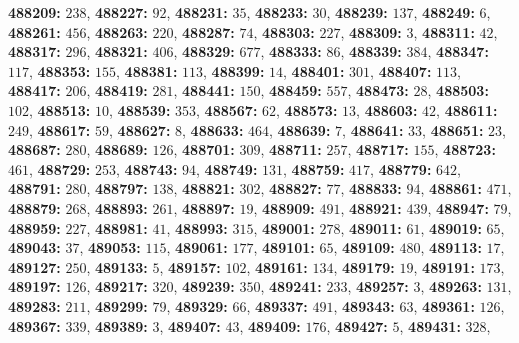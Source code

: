 \textsf{\bfseries 488209:} $238$, \textsf{\bfseries 488227:} $92$, \textsf{\bfseries 488231:} $35$, \textsf{\bfseries 488233:} $30$, \textsf{\bfseries 488239:} $137$, \textsf{\bfseries 488249:} $6$, \textsf{\bfseries 488261:} $456$, \textsf{\bfseries 488263:} $220$, \textsf{\bfseries 488287:} $74$, \textsf{\bfseries 488303:} $227$, \textsf{\bfseries 488309:} $3$, \textsf{\bfseries 488311:} $42$, \textsf{\bfseries 488317:} $296$, \textsf{\bfseries 488321:} $406$, \textsf{\bfseries 488329:} $677$, \textsf{\bfseries 488333:} $86$, \textsf{\bfseries 488339:} $384$, \textsf{\bfseries 488347:} $117$, \textsf{\bfseries 488353:} $155$, \textsf{\bfseries 488381:} $113$, \textsf{\bfseries 488399:} $14$, \textsf{\bfseries 488401:} $301$, \textsf{\bfseries 488407:} $113$, \textsf{\bfseries 488417:} $206$, \textsf{\bfseries 488419:} $281$, \textsf{\bfseries 488441:} $150$, \textsf{\bfseries 488459:} $557$, \textsf{\bfseries 488473:} $28$, \textsf{\bfseries 488503:} $102$, \textsf{\bfseries 488513:} $10$, \textsf{\bfseries 488539:} $353$, \textsf{\bfseries 488567:} $62$, \textsf{\bfseries 488573:} $13$, \textsf{\bfseries 488603:} $42$, \textsf{\bfseries 488611:} $249$, \textsf{\bfseries 488617:} $59$, \textsf{\bfseries 488627:} $8$, \textsf{\bfseries 488633:} $464$, \textsf{\bfseries 488639:} $7$, \textsf{\bfseries 488641:} $33$, \textsf{\bfseries 488651:} $23$, \textsf{\bfseries 488687:} $280$, \textsf{\bfseries 488689:} $126$, \textsf{\bfseries 488701:} $309$, \textsf{\bfseries 488711:} $257$, \textsf{\bfseries 488717:} $155$, \textsf{\bfseries 488723:} $461$, \textsf{\bfseries 488729:} $253$, \textsf{\bfseries 488743:} $94$, \textsf{\bfseries 488749:} $131$, \textsf{\bfseries 488759:} $417$, \textsf{\bfseries 488779:} $642$, \textsf{\bfseries 488791:} $280$, \textsf{\bfseries 488797:} $138$, \textsf{\bfseries 488821:} $302$, \textsf{\bfseries 488827:} $77$, \textsf{\bfseries 488833:} $94$, \textsf{\bfseries 488861:} $471$, \textsf{\bfseries 488879:} $268$, \textsf{\bfseries 488893:} $261$, \textsf{\bfseries 488897:} $19$, \textsf{\bfseries 488909:} $491$, \textsf{\bfseries 488921:} $439$, \textsf{\bfseries 488947:} $79$, \textsf{\bfseries 488959:} $227$, \textsf{\bfseries 488981:} $41$, \textsf{\bfseries 488993:} $315$, \textsf{\bfseries 489001:} $278$, \textsf{\bfseries 489011:} $61$, \textsf{\bfseries 489019:} $65$, \textsf{\bfseries 489043:} $37$, \textsf{\bfseries 489053:} $115$, \textsf{\bfseries 489061:} $177$, \textsf{\bfseries 489101:} $65$, \textsf{\bfseries 489109:} $480$, \textsf{\bfseries 489113:} $17$, \textsf{\bfseries 489127:} $250$, \textsf{\bfseries 489133:} $5$, \textsf{\bfseries 489157:} $102$, \textsf{\bfseries 489161:} $134$, \textsf{\bfseries 489179:} $19$, \textsf{\bfseries 489191:} $173$, \textsf{\bfseries 489197:} $126$, \textsf{\bfseries 489217:} $320$, \textsf{\bfseries 489239:} $350$, \textsf{\bfseries 489241:} $233$, \textsf{\bfseries 489257:} $3$, \textsf{\bfseries 489263:} $131$, \textsf{\bfseries 489283:} $211$, \textsf{\bfseries 489299:} $79$, \textsf{\bfseries 489329:} $66$, \textsf{\bfseries 489337:} $491$, \textsf{\bfseries 489343:} $63$, \textsf{\bfseries 489361:} $126$, \textsf{\bfseries 489367:} $339$, \textsf{\bfseries 489389:} $3$, \textsf{\bfseries 489407:} $43$, \textsf{\bfseries 489409:} $176$, \textsf{\bfseries 489427:} $5$, \textsf{\bfseries 489431:} $328$, 
